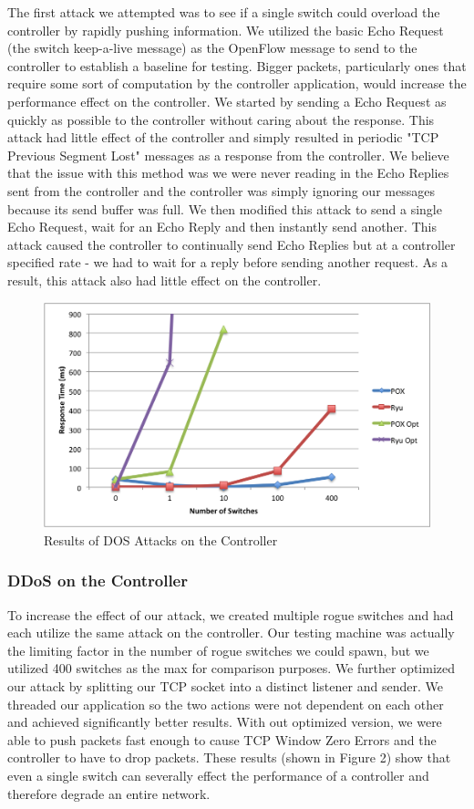  The first attack we attempted was to see if a single switch could overload the controller by rapidly pushing information. We utilized the basic Echo Request (the switch keep-a-live message) as the OpenFlow message to send to the controller to establish a baseline for testing. Bigger packets, particularly ones that require some sort of computation by the controller application, would increase the performance effect on the controller. We started by sending a Echo Request as quickly as possible to the controller without caring about the response. This attack had little effect of the controller and simply resulted in periodic "TCP Previous Segment Lost" messages as a response from the controller. We believe that the issue with this method was we were never reading in the Echo Replies sent from the controller and the controller was simply ignoring our messages because its send buffer was full. We then modified this attack to send a single Echo Request, wait for an Echo Reply and then instantly send another. This attack caused the controller to continually send Echo Replies but at a controller specified rate - we had to wait for a reply before sending another request. As a result, this attack also had little effect on the controller.

\begin{figure}
  \includegraphics[width=\linewidth]{DOSAttack.png}
  \caption{Results of DOS Attacks on the Controller \cite{protocol}}
  \label{fig:DOSattacks}
\end{figure}

\subsubsection{DDoS on the Controller}
   To increase the effect of our attack, we created multiple rogue switches and had each utilize the same attack on the controller. Our testing machine was actually the limiting factor in the number of rogue switches we could spawn, but we utilized 400 switches as the max for comparison purposes.  We further optimized our attack by splitting our TCP socket into a distinct listener and sender. We threaded our application so the two actions were not dependent on each other and achieved significantly better results. With out optimized version, we were able to push packets fast enough to cause TCP Window Zero Errors and the controller to have to drop packets.  These results (shown in Figure 2) show that even a single switch can severally effect the performance of a controller and therefore degrade an entire network. 

